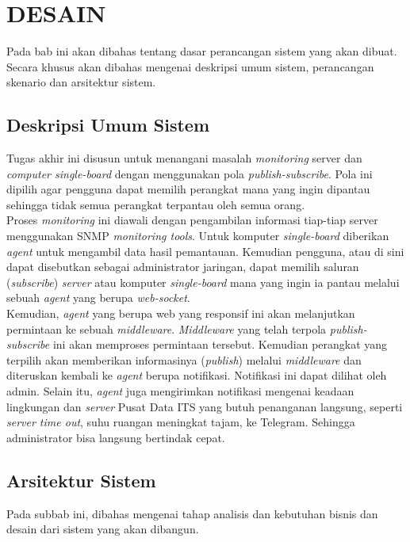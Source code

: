 \chapter{DESAIN}
\label{chapter:desain}

\tab Pada bab ini akan dibahas tentang dasar perancangan sistem yang akan dibuat. Secara khusus akan dibahas mengenai deskripsi umum sistem, perancangan skenario dan arsitektur
sistem.

\section{Deskripsi Umum Sistem}
\tab Tugas akhir ini disusun untuk menangani masalah \textit{monitoring} server dan \textit{computer single-board} dengan menggunakan pola \textit{publish-subscribe}. Pola ini dipilih agar pengguna dapat memilih perangkat mana yang ingin dipantau sehingga tidak semua perangkat terpantau oleh semua orang.\\
\tab Proses \textit{monitoring} ini diawali dengan pengambilan informasi tiap-tiap server menggunakan SNMP \textit{monitoring tools}. Untuk komputer \textit{single-board} diberikan \textit{agent} untuk mengambil data hasil pemantauan. Kemudian pengguna, atau di sini dapat disebutkan sebagai administrator jaringan, dapat memilih saluran (\textit{subscribe}) \textit{server} atau komputer \textit{single-board} mana yang ingin ia pantau melalui sebuah \textit{agent} yang berupa \textit{web-socket}.\\ 
\tab Kemudian, \textit{agent} yang berupa web yang responsif ini akan melanjutkan permintaan ke sebuah \textit{middleware}. \textit{Middleware} yang telah terpola \textit{publish-subscribe} ini akan memproses permintaan tersebut. Kemudian perangkat yang terpilih akan memberikan informasinya (\textit{publish}) melalui \textit{middleware} dan diteruskan kembali ke \textit{agent} berupa notifikasi. Notifikasi ini dapat dilihat oleh admin. Selain itu, \textit{agent} juga mengirimkan notifikasi mengenai keadaan lingkungan dan \textit{server} Pusat Data ITS yang butuh penanganan langsung, seperti \textit{server time out}, suhu ruangan meningkat tajam, ke Telegram. Sehingga administrator bisa langsung bertindak cepat.


\section{Arsitektur Sistem}
\tab Pada subbab ini, dibahas mengenai tahap analisis dan kebutuhan bisnis dan desain dari sistem yang akan dibangun.

